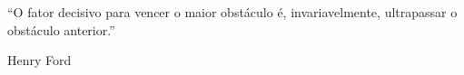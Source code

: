 %
%
\thispagestyle{empty}
\begin{epigrafe}
\begin{em}

``O fator decisivo para vencer o maior obstáculo é, invariavelmente, ultrapassar o obstáculo anterior.''
\newline
\newline
\end{em}
\begin{autorepigrafe}
Henry Ford
\end{autorepigrafe}

\end{epigrafe}


